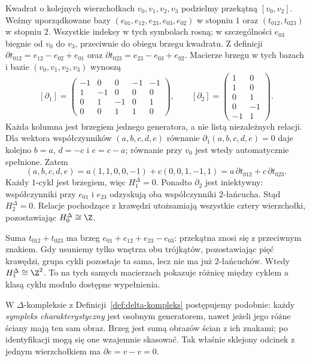 \begin{przyklad}
\label{prz:homologia-kwadrat}
Kwadrat o kolejnych wierzchołkach $v_0,v_1,v_2,v_3$
podzielmy przekątną $[v_0,v_2]$.
Weźmy uporządkowane bazy
$(e_{01},e_{12},e_{23},e_{03},e_{02})$ w stopniu $1$
oraz $(t_{012},t_{023})$ w stopniu $2$.
Wszystkie indeksy w tych symbolach rosną; w szczególności
$e_{03}$ biegnie od $v_0$ do $v_3$, przeciwnie do obiegu brzegu
kwadratu. Z definicji
$\partial t_{012}=e_{12}-e_{02}+e_{01}$ oraz
$\partial t_{023}=e_{23}-e_{03}+e_{02}$.
Macierze brzegu w tych bazach i bazie $(v_0,v_1,v_2,v_3)$ wynoszą
\[
 [\partial_1]=
 \begin{pmatrix}
 -1&0&0&-1&-1\\
 1&-1&0&0&0\\
 0&1&-1&0&1\\
 0&0&1&1&0
 \end{pmatrix},\qquad
 [\partial_2]=
 \begin{pmatrix}1&0\\1&0\\0&1\\0&-1\\-1&1\end{pmatrix}.
\]
Każda kolumna jest brzegiem jednego generatora, a nie listą
niezależnych relacji. Dla wektora współczynników $(a,b,c,d,e)$
równanie $\partial_1(a,b,c,d,e)=0$ daje kolejno
$b=a$, $d=-c$ i $e=c-a$; równanie przy $v_0$ jest wtedy
automatycznie spełnione. Zatem
\[
 (a,b,c,d,e)
 =a(1,1,0,0,-1)+c(0,0,1,-1,1)
 =a\,\partial t_{012}+c\,\partial t_{023}.
\]
Każdy $1$-cykl jest brzegiem, więc $H_1^\Delta=0$.
Ponadto $\partial_2$ jest iniektywny: współczynniki przy
$e_{01}$ i $e_{23}$ odzyskują oba współczynniki $2$-łańcucha.
Stąd $H_2^\Delta=0$. Relacje pochodzące z krawędzi utożsamiają
wszystkie cztery wierzchołki, pozostawiając $H_0^\Delta\cong\Z$.

Suma $t_{012}+t_{023}$ ma brzeg
$e_{01}+e_{12}+e_{23}-e_{03}$: przekątna znosi się z przeciwnym
znakiem. Gdy usuniemy tylko wnętrza obu trójkątów, pozostawiając
pięć krawędzi, grupa cykli pozostaje ta sama, lecz nie ma już
$2$-łańcuchów. Wtedy $H_1^\Delta\cong\Z^2$.
To na tych samych macierzach pokazuje różnicę między cyklem
a klasą cyklu modulo dostępne wypełnienia.
\end{przyklad}

W $\Delta$-kompleksie z
Definicji~\ref{def:delta-kompleks} postępujemy
podobnie: każdy \emph{sympleks charakterystyczny}
jest osobnym generatorem, nawet jeżeli jego
różne ściany mają ten sam obraz. Brzeg
jest sumą obrazów ścian z ich znakami;
po identyfikacji mogą się one wzajemnie
skasować. Tak właśnie sklejony odcinek
z jednym wierzchołkiem ma $\partial e=v-v=0$.

